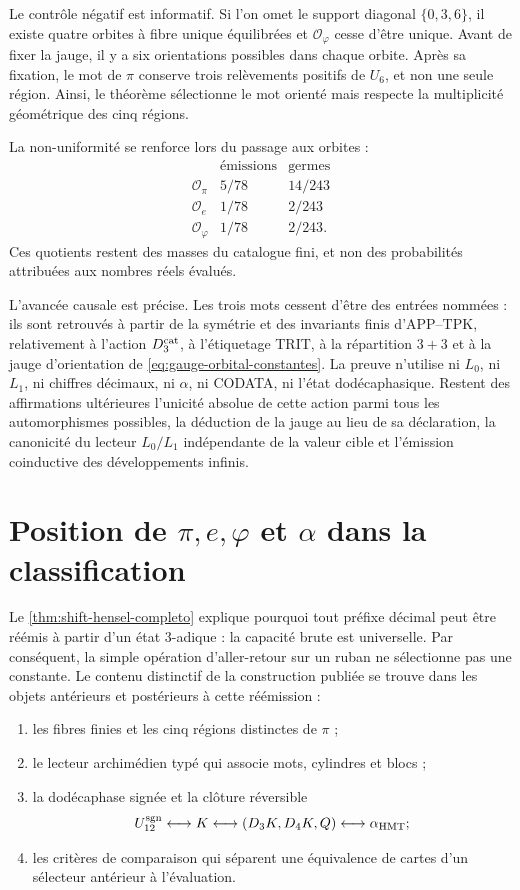 Le contrôle négatif est informatif. Si l'on omet le support diagonal
\(\{0,3,6\}\), il existe quatre orbites à fibre unique équilibrées et
\(\mathcal O_\varphi\) cesse d'être unique. Avant de fixer la jauge, il y a six
orientations possibles dans chaque orbite. Après sa fixation, le mot de
\(\pi\) conserve trois relèvements positifs de \(U_6\), et non une seule région.
Ainsi, le théorème sélectionne le mot orienté mais respecte la multiplicité
géométrique des cinq régions.

La non-uniformité se renforce lors du passage aux orbites :
\[
\begin{array}{c|cc}
&\text{émissions}&\text{germes}\\ \hline
\mathcal O_\pi&5/78&14/243\\
\mathcal O_e&1/78&2/243\\
\mathcal O_\varphi&1/78&2/243.
\end{array}
\]
Ces quotients restent des masses du catalogue fini, et non des probabilités
attribuées aux nombres réels évalués.

L'avancée causale est précise. Les trois mots cessent d'être des entrées
nommées : ils sont retrouvés à partir de la symétrie et des invariants finis
d'APP--TPK, relativement à l'action \(D_3^{\rm cat}\), à l'étiquetage TRIT,
à la répartition \(3+3\) et à la jauge d'orientation de
\cref{eq:gauge-orbital-constantes}. La preuve n'utilise ni \(L_0\), ni \(L_1\),
ni chiffres décimaux, ni \(\alpha\), ni CODATA, ni l'état dodécaphasique. Restent des
affirmations ultérieures l'unicité absolue de cette action parmi tous les
automorphismes possibles, la déduction de la jauge au lieu de sa déclaration, la
canonicité du lecteur \(L_0/L_1\) indépendante de la valeur cible et l'émission coinductive des
développements infinis.

\section{Position de \texorpdfstring{\(\pi,e,\varphi\) et \(\alpha\)}{pi, e, phi et alpha} dans la classification}

Le \cref{thm:shift-hensel-completo} explique pourquoi tout préfixe
décimal peut être réémis à partir d'un état 3-adique : la capacité brute est
universelle. Par conséquent, la simple opération d'aller-retour sur un ruban ne sélectionne pas une
constante. Le contenu distinctif de la construction publiée se trouve
dans les objets antérieurs et postérieurs à cette réémission :
\begin{enumerate}
\item les fibres finies et les cinq régions distinctes de \(\pi\) ;
\item le lecteur archimédien typé qui associe mots, cylindres et blocs ;
\item la dodécaphase signée et la clôture réversible
\[
U_{12}^{\rm sgn}
\longleftrightarrow K
\longleftrightarrow(D_3K,D_4K,Q)
\longleftrightarrow\alpha_{\rm HMT};
\]
\item les critères de comparaison qui séparent une équivalence de cartes d'un
sélecteur antérieur à l'évaluation.
\end{enumerate}

